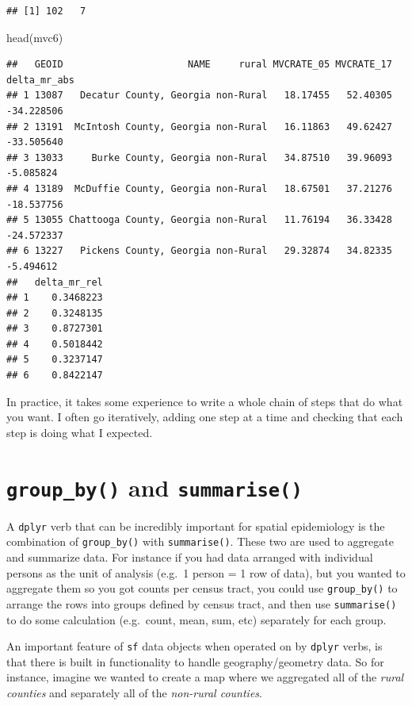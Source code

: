 \documentclass[
]{book}
\newenvironment{Shaded}{\begin{snugshade}}{\end{snugshade}}
\newcommand{\FunctionTok}[1]{\textcolor[rgb]{0.00,0.00,0.00}{#1}}
\newcommand{\NormalTok}[1]{#1}
\begin{document}
\begin{verbatim}
## [1] 102   7
\end{verbatim}

\begin{Shaded}
\begin{Highlighting}[]
\FunctionTok{head}\NormalTok{(mvc6)}
\end{Highlighting}
\end{Shaded}

\begin{verbatim}
##   GEOID                      NAME     rural MVCRATE_05 MVCRATE_17 delta_mr_abs
## 1 13087   Decatur County, Georgia non-Rural   18.17455   52.40305   -34.228506
## 2 13191  McIntosh County, Georgia non-Rural   16.11863   49.62427   -33.505640
## 3 13033     Burke County, Georgia non-Rural   34.87510   39.96093    -5.085824
## 4 13189  McDuffie County, Georgia non-Rural   18.67501   37.21276   -18.537756
## 5 13055 Chattooga County, Georgia non-Rural   11.76194   36.33428   -24.572337
## 6 13227   Pickens County, Georgia non-Rural   29.32874   34.82335    -5.494612
##   delta_mr_rel
## 1    0.3468223
## 2    0.3248135
## 3    0.8727301
## 4    0.5018442
## 5    0.3237147
## 6    0.8422147
\end{verbatim}

In practice, it takes some experience to write a whole chain of steps that do what you want. I often go iteratively, adding one step at a time and checking that each step is doing what I expected.

\hypertarget{group_by-and-summarise}{%
\section{\texorpdfstring{\texttt{group\_by()} and \texttt{summarise()}}{group\_by() and summarise()}}\label{group_by-and-summarise}}

A \texttt{dplyr} verb that can be incredibly important for spatial epidemiology is the combination of \texttt{group\_by()} with \texttt{summarise()}. These two are used to aggregate and summarize data. For instance if you had data arranged with individual persons as the unit of analysis (e.g.~1 person = 1 row of data), but you wanted to aggregate them so you got counts per census tract, you could use \texttt{group\_by()} to arrange the rows into groups defined by census tract, and then use \texttt{summarise()} to do some calculation (e.g.~count, mean, sum, etc) separately for each group.

An important feature of \texttt{sf} data objects when operated on by \texttt{dplyr} verbs, is that there is built in functionality to handle geography/geometry data. So for instance, imagine we wanted to create a map where we aggregated all of the \emph{rural counties} and separately all of the \emph{non-rural counties}.
\end{document}
